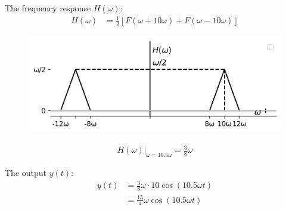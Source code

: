 \documentclass[journal,12pt,twocolumn]{IEEEtran}
\begin{document}
\newpage
The frequency response \(H(\omega)\):
\begin{align}
H(\omega) &= \frac{1}{2} \left[F(\omega + 10\omega) + F(\omega - 10\omega)\right] 
\end{align}
\begin{figure}[ht!]
    \centering
    \includegraphics[width=\columnwidth]{figs/plot3.png}
    \caption{}
    \label{fig:sr3}
\end{figure}

\begin{align}
H(\omega)\bigg|_{\omega=10.5\omega} = \frac{3}{8}\omega
\end{align}

The output \(y(t)\):
\begin{align}
y(t) &= \frac{3}{8}\omega \cdot 10 \cos(10.5 \omega t) \\
&= \frac{15}{4}\omega \cos(10.5 \omega t)
\end{align}
\end{document}
